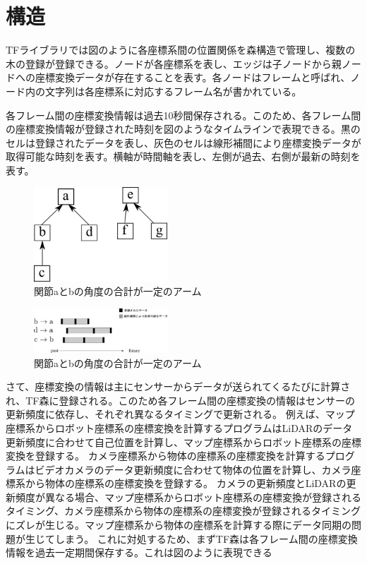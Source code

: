 \documentclass[a4paper]{jreport}	%
\begin{document}
\section{構造}
TFライブラリでは図のように各座標系間の位置関係を森構造で管理し、複数の木の登録が登録できる。ノードが各座標系を表し、エッジは子ノードから親ノードへの座標変換データが存在することを表す。各ノードはフレームと呼ばれ、ノード内の文字列は各座標系に対応するフレーム名が書かれている。

各フレーム間の座標変換情報は過去10秒間保存される。このため、各フレーム間の座標変換情報が登録された時刻を図のようなタイムラインで表現できる。黒のセルは登録されたデータを表し、灰色のセルは線形補間により座標変換データが取得可能な時刻を表す。横軸が時間軸を表し、左側が過去、右側が最新の時刻を表す。



\begin{figure}[h] 
\centering
\includegraphics[width=5cm]{multitree.png}	
\caption{関節aとbの角度の合計が一定のアーム}
\label{fig:multitree}
\end{figure}

\begin{figure}[h] 
\centering
\includegraphics[width=5cm]{general-timeline.png}
\caption{関節aとbの角度の合計が一定のアーム}
\label{fig:general-timeline}
\end{figure}



さて、座標変換の情報は主にセンサーからデータが送られてくるたびに計算され、TF森に登録される。このため各フレーム間の座標変換の情報はセンサーの更新頻度に依存し、それぞれ異なるタイミングで更新される。
例えば、マップ座標系からロボット座標系の座標変換を計算するプログラムはLiDARのデータ更新頻度に合わせて自己位置を計算し、マップ座標系からロボット座標系の座標変換を登録する。
カメラ座標系から物体の座標系の座標変換を計算するプログラムはビデオカメラのデータ更新頻度に合わせて物体の位置を計算し、カメラ座標系から物体の座標系の座標変換を登録する。
カメラの更新頻度とLiDARの更新頻度が異なる場合、マップ座標系からロボット座標系の座標変換が登録されるタイミング、カメラ座標系から物体の座標系の座標変換が登録されるタイミングにズレが生じる。マップ座標系から物体の座標系を計算する際にデータ同期の問題が生じてしまう。
これに対処するため、まずTF森は各フレーム間の座標変換情報を過去一定期間保存する。これは図のように表現できる
\end{document}
